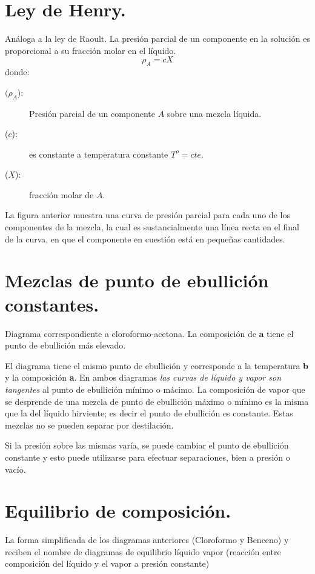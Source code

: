 \documentclass[11pt,openany]{book}
\begin{document}
\section{Ley de Henry.}

Análoga a la ley de Raoult. La presión parcial de un componente en la solución es proporcional a su 
fracción molar en el líquido.
\begin{equation}
\boxed{\rho_A=c X}
\end{equation}
donde:
\begin{description}
\item [$(\rho_A$):] Presión parcial de un componente $A$ sobre una mezcla líquida.
\item [($c$):] es constante a temperatura constante $T^o=cte.$
\item [($X$):] fracción molar de $A$.
\end{description}
La figura anterior muestra una curva de presión parcial para cada uno de los componentes de la 
mezcla, la cual es sustancialmente una línea recta en el final de la curva, en que el componente en 
cuestión está en pequeñas cantidades.

\section{Mezclas de punto de ebullición constantes.}

Diagrama correspondiente a cloroformo-acetona. La composición de \textbf{a} tiene el punto de ebullición más elevado.

El diagrama tiene el mismo punto de ebullición y corresponde a la temperatura \textbf{b} y la composición \textbf{a}.
En ambos diagramas \textit{las curvas de líquido y vapor son tangentes} al punto de ebullición mínimo o mácimo.
La composición de vapor que se desprende de una mezcla de punto de ebullición máximo o mínimo es la misma que la del líquido
hirviente; es decir el punto de ebullición es constante.
Estas mezclas no se pueden separar por destilación.

Si la presión sobre las mismas varía, se puede cambiar el punto de ebullición constante y esto puede utilizarse para 
efectuar separaciones, bien a presión o vacío.

\section{Equilibrio de composición.}

La forma simplificada de los diagramas anteriores (Cloroformo y Benceno) y reciben el nombre de diagramas de equilibrio 
líquido vapor (reacción entre composición del líquido y el vapor a presión constante)
\end{document}
